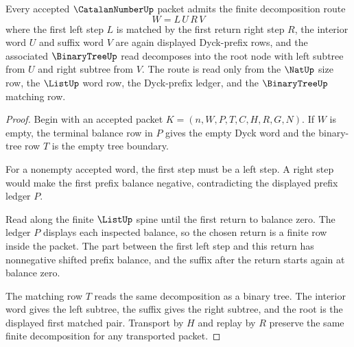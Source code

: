 \begin{theorem}
\label{thm:catalan-number-dyck-prefix-induction}
Every accepted $\CatalanNumberUp$ packet admits the finite decomposition route
$$
W = L\, U\, R\, V
$$
where the first left step $L$ is matched by the first return right step $R$, the interior word $U$ and suffix word $V$ are again displayed Dyck-prefix rows, and the associated $\BinaryTreeUp$ read decomposes into the root node with left subtree from $U$ and right subtree from $V$. The route is read only from the $\NatUp$ size row, the $\ListUp$ word row, the Dyck-prefix ledger, and the $\BinaryTreeUp$ matching row.
\end{theorem}
\begin{proof}
Begin with an accepted packet $K=(n,W,P,T,C,H,R,G,N)$. If $W$ is empty, the terminal balance row in $P$ gives the empty Dyck word and the binary-tree row $T$ is the empty tree boundary.

For a nonempty accepted word, the first step must be a left step. A right step would make the first prefix balance negative, contradicting the displayed prefix ledger $P$.

Read along the finite $\ListUp$ spine until the first return to balance zero. The ledger $P$ displays each inspected balance, so the chosen return is a finite row inside the packet. The part between the first left step and this return has nonnegative shifted prefix balance, and the suffix after the return starts again at balance zero.

The matching row $T$ reads the same decomposition as a binary tree. The interior word gives the left subtree, the suffix gives the right subtree, and the root is the displayed first matched pair. Transport by $H$ and replay by $R$ preserve the same finite decomposition for any transported packet.
\end{proof}


\begin{closurestatus}{\CatalanNumberUp}
  \theoryclosure{\seedClosure}
  \formalstatus{\unformalizedV}
\end{closurestatus}
